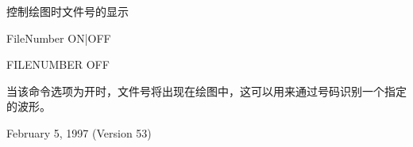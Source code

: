 \label{cmd:filenumber}

控制绘图时文件号的显示

FileNumber {ON|OFF}

FILENUMBER OFF

当该命令选项为开时，文件号将出现在绘图中，这可以用来通过号码识别一个指定的波形。

February 5, 1997 (Version 53)


